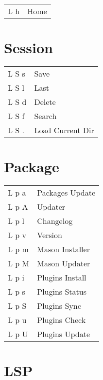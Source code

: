 \documentclass[
  ,landscape
  ,columns=4
]{cheatsheet}
\begin{document}
\begin{tabular}{ll}
	L h & Home \\
\end{tabular}

\section{Session}

\begin{tabular}{ll}
	L S s & Save             \\
	L S l & Last             \\
	L S d & Delete           \\
	L S f & Search           \\
	L S . & Load Current Dir \\
\end{tabular}

\section{Package}

\begin{tabular}{ll}
	L p a & Packages Update \\
	L p A & Updater         \\
	L p l & Changelog       \\
	L p v & Version         \\
	L p m & Mason Installer \\
	L p M & Mason Updater   \\
	L p i & Plugins Install \\
	L p s & Plugins Status  \\
	L p S & Plugins Sync    \\
	L p u & Plugins Check   \\
	L p U & Plugins Update  \\
\end{tabular}

\section{LSP}
\end{document}
